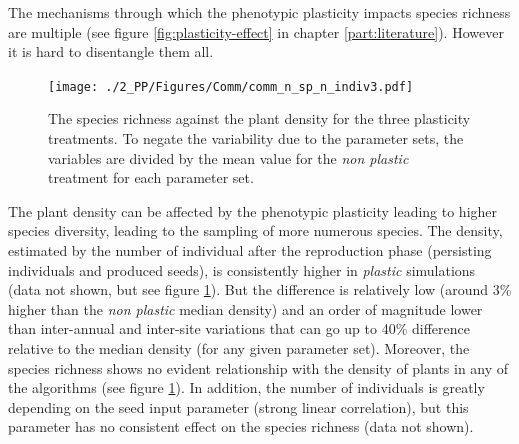 The mechanisms through which the phenotypic plasticity impacts species richness are multiple (see figure \ref{fig:plasticity-effect} in chapter \ref{part:literature}). However it is hard to disentangle them all.




\begin{figure}%
    \texttt{[image: ./2\_PP/Figures/Comm/comm\_n\_sp\_n\_indiv3.pdf]}%
  \caption[The species richness relative to the plant density]{The species richness against the plant density for the three plasticity treatments. To negate the variability due to the parameter sets, the variables are divided by the mean value for the \textit{non plastic} treatment for each parameter set.}
  \label{fig:species_per_plant}
\end{figure}

The plant density can be affected by the phenotypic plasticity leading to higher species diversity\parencite{lepik_high_2005}, leading to the sampling of more numerous species. The density, estimated by the number of individual after the reproduction phase (persisting individuals and produced seeds), is consistently higher in \textit{plastic} simulations (data not shown, but see figure \ref{fig:species_per_plant}). But the difference is relatively low (around 3\% higher than the \textit{non plastic} median density) and an order of magnitude lower than inter-annual and inter-site variations that can go up to 40\% difference relative to the median density (for any given parameter set). Moreover, the species richness shows no evident relationship with the density of plants in any of the algorithms (see figure \ref{fig:species_per_plant}). In addition, the number of individuals is greatly depending on the seed input parameter (strong linear correlation), but this parameter has no consistent effect on the species richness (data not shown).


